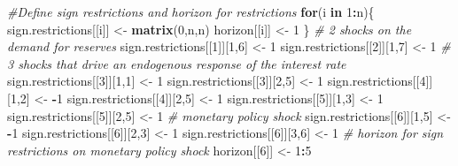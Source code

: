 \documentclass[
  11pt,
]{book}
\newenvironment{Shaded}{\begin{snugshade}}{\end{snugshade}}
\newcommand{\CommentTok}[1]{\textcolor[rgb]{0.56,0.35,0.01}{\textit{#1}}}
\newcommand{\ControlFlowTok}[1]{\textcolor[rgb]{0.13,0.29,0.53}{\textbf{#1}}}
\newcommand{\DecValTok}[1]{\textcolor[rgb]{0.00,0.00,0.81}{#1}}
\newcommand{\FunctionTok}[1]{\textcolor[rgb]{0.13,0.29,0.53}{\textbf{#1}}}
\newcommand{\NormalTok}[1]{#1}
\newcommand{\OtherTok}[1]{\textcolor[rgb]{0.56,0.35,0.01}{#1}}
\newcommand{\SpecialCharTok}[1]{\textcolor[rgb]{0.81,0.36,0.00}{\textbf{#1}}}
\theoremstyle{definition}
\theoremstyle{definition}
\theoremstyle{definition}
\theoremstyle{definition}
\theoremstyle{remark}
\begin{document}
\begin{Shaded}
\begin{Highlighting}[]
\CommentTok{\#Define sign restrictions and horizon for restrictions}
\ControlFlowTok{for}\NormalTok{(i }\ControlFlowTok{in} \DecValTok{1}\SpecialCharTok{:}\NormalTok{n)\{}
\NormalTok{  sign.restrictions[[i]] }\OtherTok{\textless{}{-}} \FunctionTok{matrix}\NormalTok{(}\DecValTok{0}\NormalTok{,n,n)}
\NormalTok{  horizon[[i]] }\OtherTok{\textless{}{-}} \DecValTok{1}
\NormalTok{\}}
\CommentTok{\# 2 shocks on the demand for reserves}
\NormalTok{sign.restrictions[[}\DecValTok{1}\NormalTok{]][}\DecValTok{1}\NormalTok{,}\DecValTok{6}\NormalTok{] }\OtherTok{\textless{}{-}} \DecValTok{1} 
\NormalTok{sign.restrictions[[}\DecValTok{2}\NormalTok{]][}\DecValTok{1}\NormalTok{,}\DecValTok{7}\NormalTok{] }\OtherTok{\textless{}{-}} \DecValTok{1}
\CommentTok{\# 3 shocks that drive an endogenous response of the interest rate}
\NormalTok{sign.restrictions[[}\DecValTok{3}\NormalTok{]][}\DecValTok{1}\NormalTok{,}\DecValTok{1}\NormalTok{] }\OtherTok{\textless{}{-}} \DecValTok{1}
\NormalTok{sign.restrictions[[}\DecValTok{3}\NormalTok{]][}\DecValTok{2}\NormalTok{,}\DecValTok{5}\NormalTok{] }\OtherTok{\textless{}{-}} \DecValTok{1}
\NormalTok{sign.restrictions[[}\DecValTok{4}\NormalTok{]][}\DecValTok{1}\NormalTok{,}\DecValTok{2}\NormalTok{] }\OtherTok{\textless{}{-}} \SpecialCharTok{{-}}\DecValTok{1}
\NormalTok{sign.restrictions[[}\DecValTok{4}\NormalTok{]][}\DecValTok{2}\NormalTok{,}\DecValTok{5}\NormalTok{] }\OtherTok{\textless{}{-}} \DecValTok{1}
\NormalTok{sign.restrictions[[}\DecValTok{5}\NormalTok{]][}\DecValTok{1}\NormalTok{,}\DecValTok{3}\NormalTok{] }\OtherTok{\textless{}{-}} \DecValTok{1}
\NormalTok{sign.restrictions[[}\DecValTok{5}\NormalTok{]][}\DecValTok{2}\NormalTok{,}\DecValTok{5}\NormalTok{] }\OtherTok{\textless{}{-}} \DecValTok{1}
\CommentTok{\# monetary policy shock}
\NormalTok{sign.restrictions[[}\DecValTok{6}\NormalTok{]][}\DecValTok{1}\NormalTok{,}\DecValTok{5}\NormalTok{] }\OtherTok{\textless{}{-}} \SpecialCharTok{{-}}\DecValTok{1}
\NormalTok{sign.restrictions[[}\DecValTok{6}\NormalTok{]][}\DecValTok{2}\NormalTok{,}\DecValTok{3}\NormalTok{] }\OtherTok{\textless{}{-}} \DecValTok{1}
\NormalTok{sign.restrictions[[}\DecValTok{6}\NormalTok{]][}\DecValTok{3}\NormalTok{,}\DecValTok{6}\NormalTok{] }\OtherTok{\textless{}{-}} \DecValTok{1}
\CommentTok{\# horizon for sign restrictions on monetary policy shock}
\NormalTok{horizon[[}\DecValTok{6}\NormalTok{]] }\OtherTok{\textless{}{-}} \DecValTok{1}\SpecialCharTok{:}\DecValTok{5}


\end{Highlighting}
\end{Shaded}
\end{document}
